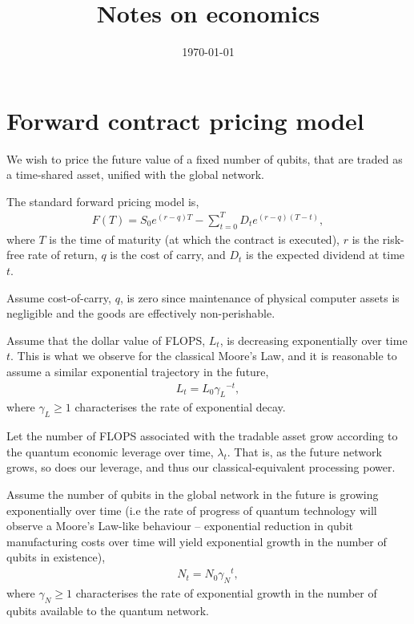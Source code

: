 \documentclass[aps,pra,twocolumn,amsmath,amssymb,nofootinbib,superscriptaddress]{revtex4}
\begin{document}


%
%

\title{Notes on economics}

%
%

\date{\today}

\frenchspacing

%
%

\begin{abstract}
\end{abstract}

\maketitle 

\section{Forward contract pricing model}

We wish to price the future value of a fixed number of qubits, that are traded as a time-shared asset, unified with the global network.

The standard forward pricing model is,
\begin{align}
F(T) = S_0 e^{(r-q)T} - \sum_{t=0}^T D_t e^{(r-q)(T-t)},
\end{align}
where $T$ is the time of maturity (at which the contract is executed), $r$ is the risk-free rate of return, $q$ is the cost of carry, and $D_t$ is the expected dividend at time $t$.

Assume cost-of-carry, $q$, is zero since maintenance of physical computer assets is negligible and the goods are effectively non-perishable.

Assume that the dollar value of FLOPS, $L_t$, is decreasing exponentially over time $t$. This is what we observe for the classical Moore's Law, and it is reasonable to assume a similar exponential trajectory in the future,
\begin{align}
	L_t = L_0{\gamma_L}^{-t},
\end{align}
where \mbox{$\gamma_L\geq 1$} characterises the rate of exponential decay.

Let the number of FLOPS associated with the tradable asset grow according to the quantum economic leverage over time, $\lambda_t$. That is, as the future network grows, so does our leverage, and thus our classical-equivalent processing power.

Assume the number of qubits in the global network in the future is growing exponentially over time (i.e the rate of progress of quantum technology will observe a Moore's Law-like behaviour -- exponential reduction in qubit manufacturing costs over time will yield exponential growth in the number of qubits in existence),
\begin{align}
	N_t = N_0 {\gamma_N}^{t},
\end{align}
where \mbox{$\gamma_N\geq 1$} characterises the rate of exponential growth in the number of qubits available to the quantum network.
\end{document}
